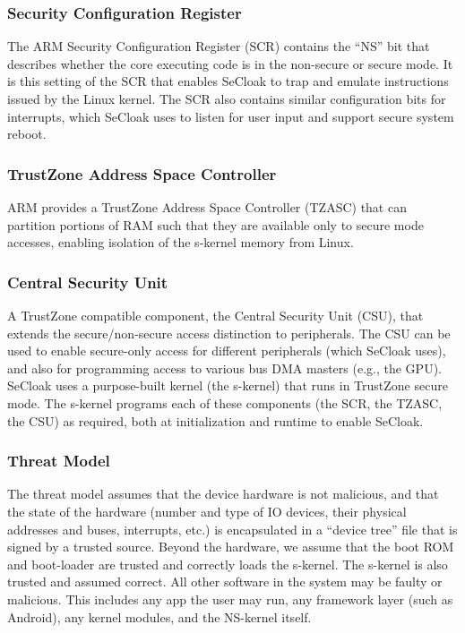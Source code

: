 \documentclass{article}
\begin{document}
\subsubsection{Security Configuration Register}

The ARM Security Configuration Register (SCR) contains the “NS” bit that describes whether the core executing code is in the non-secure or secure mode. It is this setting of the SCR that enables SeCloak to trap and emulate instructions issued by the Linux kernel. The SCR also contains similar configuration bits for interrupts, which SeCloak uses to listen for user input and support secure system reboot. 

\subsubsection{TrustZone Address Space Controller}

ARM provides a TrustZone Address Space Controller (TZASC) that can partition portions of RAM such that they are available only to secure mode accesses, enabling isolation of the s-kernel memory from Linux.

\subsubsection{Central Security Unit}

A TrustZone compatible component, the Central Security Unit (CSU), that extends the secure/non-secure access distinction to peripherals. The CSU can be used to enable secure-only access for different peripherals (which SeCloak uses), and also for programming access to various bus DMA masters (e.g., the GPU). SeCloak uses a purpose-built kernel (the s-kernel) that runs
in TrustZone secure mode. The s-kernel programs each of these
components (the SCR, the TZASC, the CSU) as required, both at
initialization and runtime to enable SeCloak.

\subsubsection{Threat Model}

The threat model assumes that the device hardware is not malicious, and that the state of the hardware (number and type of IO devices, their physical addresses and buses, interrupts, etc.) is encapsulated in a “device tree” file that is signed by a trusted source. Beyond the hardware, we assume that the boot ROM and boot-loader are trusted and correctly loads the s-kernel. The s-kernel is also trusted and assumed correct. All other software in the system may be faulty or malicious. This includes any app the user may run, any framework layer (such as Android), any kernel modules, and the NS-kernel itself.
\end{document}
